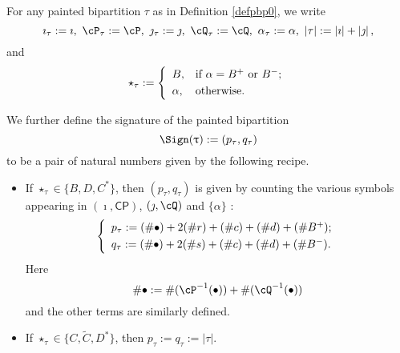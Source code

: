 \documentclass[12pt,a4paper]{amsart}
\def\abs#1{\left|{#1}\right|}
\newcommand{\CP}{{\mathcal {P}}}
\newcommand{\CQ}{{\mathcal {Q}}}
\numberwithin{equation}{section}
\theoremstyle{remark}
\newtheorem{remark}[thm]{Remark}
\def\CP{\mathsf{CP}}
\def\CQ{\overline{\sfA}}%
\begin{document}

For any painted bipartition $\tau$ as in Definition \ref{defpbp0}, we write
\[
  \imath_\tau:=\imath,\ \cP_\tau:=\cP,\ \jmath_\tau:=\jmath,\ \cQ_\tau:=\cQ,\ \alpha_\tau:=\alpha,\ \abs{\tau}:=\abs{\imath}+\abs{\jmath},
\]
and
\[
  \star_\tau:= \left\{
    \begin{array}{ll}
      B, &\hbox{if $\alpha=B^+$ or $B^-$}; \smallskip\\
      \alpha, & \hbox{otherwise}.           \end{array}
  \right.
\]

We further define the signature of the painted bipartition
\[
\Sign(\uptau):=(p_{\tau}, q_{\tau})
\]
to be a pair  of natural numbers given by the
following recipe.
\begin{itemize}
  \item If $\star_\tau\in \{B, D, C^*\}$, then $(p_\tau, q_\tau)$ is given by
        counting the various symbols appearing in $(\imath, \CP)$,
        $(\jmath, \cQ)$ and $\{\alpha\}$ :
        \begin{equation*}%
          \left\{
            \begin{array}{l}
              p_\tau :=( \# \bullet)+ 2 (\# r) +(\# c )+ (\# d) + (\# B^+);\smallskip\\
              q_\tau :=( \# \bullet)+ 2 (\# s) + (\# c) + (\# d) + (\# B^-).\\
            \end{array}
          \right.
        \end{equation*}
        Here
        \[
        \#\bullet:=\#(\cP^{-1}(\bullet))+\#(\cQ^{-1}(\bullet))
        \]
        and the other terms are similarly defined.
  \item If $\star_\tau\in \{C, \widetilde C, D^*\}$, then
        $p_\tau:=q_\tau:=\abs{\tau}$.
\end{itemize}
\smallskip
\end{document}
